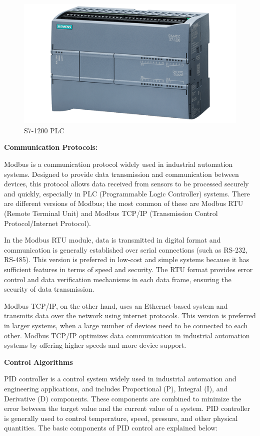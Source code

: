 \begin{figure}[H]
    \centering
    \includegraphics[width=0.8\columnwidth]{imgs/s7-1200.png}
    \caption[S7-1200 PLC]{S7-1200 PLC}
    \label{fig-magnitude}
\end{figure}%

\textbf{Communication Protocols:} 

Modbus is a communication protocol widely used in industrial automation systems. Designed to provide data transmission and communication between devices, this protocol allows data received from sensors to be processed securely and quickly, especially in PLC (Programmable Logic Controller) systems. There are different versions of Modbus; the most common of these are Modbus RTU (Remote Terminal Unit) and Modbus TCP/IP (Transmission Control Protocol/Internet Protocol).

In the Modbus RTU module, data is transmitted in digital format and communication is generally established over serial connections (such as RS-232, RS-485). This version is preferred in low-cost and simple systems because it has sufficient features in terms of speed and security. The RTU format provides error control and data verification mechanisms in each data frame, ensuring the security of data transmission.

Modbus TCP/IP, on the other hand, uses an Ethernet-based system and transmits data over the network using internet protocols. This version is preferred in larger systems, when a large number of devices need to be connected to each other. Modbus TCP/IP optimizes data communication in industrial automation systems by offering higher speeds and more device support.

\textbf{Control Algorithms}  

PID controller is a control system widely used in industrial automation and engineering applications, and includes Proportional (P), Integral (I), and Derivative (D) components. These components are combined to minimize the error between the target value and the current value of a system. PID controller is generally used to control temperature, speed, pressure, and other physical quantities. The basic components of PID control are explained below:

